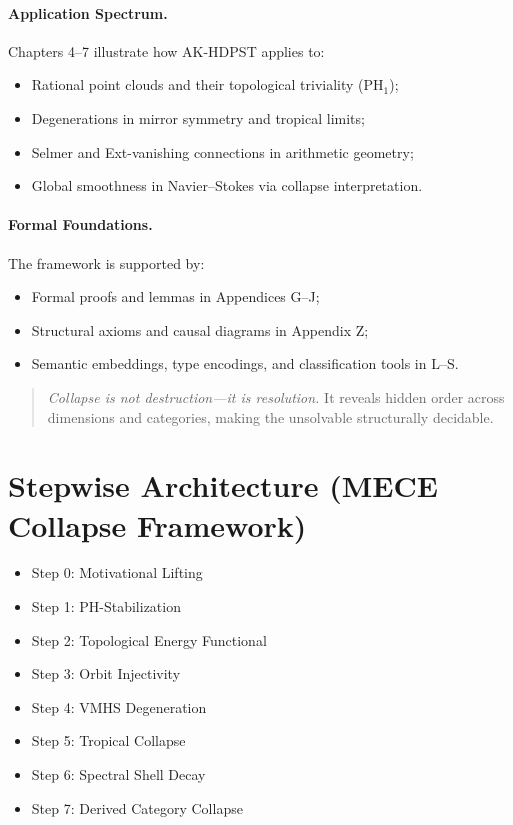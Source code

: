 \documentclass[11pt]{article}
\begin{document}
\paragraph{Application Spectrum.}
Chapters 4–7 illustrate how AK-HDPST applies to:
\begin{itemize}
  \item Rational point clouds and their topological triviality (PH\(_1\));
  \item Degenerations in mirror symmetry and tropical limits;
  \item Selmer and Ext-vanishing connections in arithmetic geometry;
  \item Global smoothness in Navier–Stokes via collapse interpretation.
\end{itemize}

\paragraph{Formal Foundations.}
The framework is supported by:
\begin{itemize}
  \item Formal proofs and lemmas in Appendices G–J;
  \item Structural axioms and causal diagrams in Appendix Z;
  \item Semantic embeddings, type encodings, and classification tools in L–S.
\end{itemize}

\begin{quote}
\emph{Collapse is not destruction—it is resolution.}  
It reveals hidden order across dimensions and categories, making the unsolvable structurally decidable.
\end{quote}





\section{Stepwise Architecture (MECE Collapse Framework)}
\begin{itemize}
    \item Step 0: Motivational Lifting
    \item Step 1: PH-Stabilization
    \item Step 2: Topological Energy Functional
    \item Step 3: Orbit Injectivity
    \item Step 4: VMHS Degeneration
    \item Step 5: Tropical Collapse
    \item Step 6: Spectral Shell Decay
    \item Step 7: Derived Category Collapse
\end{itemize}
\end{document}
